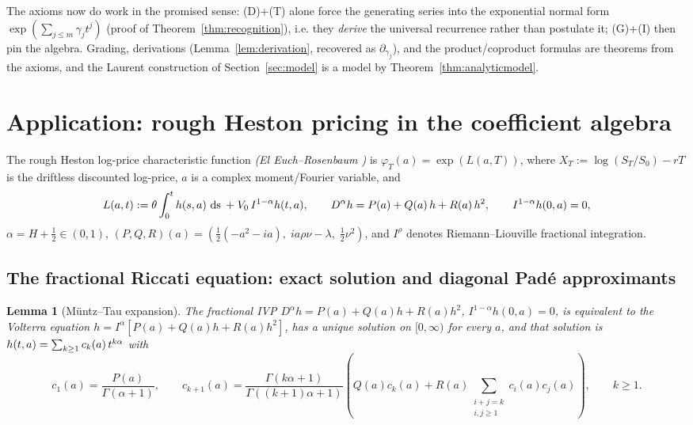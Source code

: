 \documentclass{article}
\newcommand{\assign}{:=}
\newcommand{\tmem}[1]{{\em #1\/}}
\newcommand{\tmop}[1]{\ensuremath{\operatorname{#1}}}
\newtheorem{lemma}{Lemma}
{\theorembodyfont{\rmfamily\small}\newtheorem{problem}{Problem}}
\begin{document}
\begin{remark}
  \label{rem:axiomsdowork}The axioms now do work in the promised sense:
  (D)+(T) alone force the generating series into the exponential normal form
  $\exp (\sum_{j \le m} \gamma_j t^j)$ (proof of
  Theorem~\ref{thm:recognition}), i.e. they {\tmem{derive}} the universal
  recurrence rather than postulate it; (G)+(I) then pin the algebra. Grading,
  derivations (Lemma~\ref{lem:derivation}, recovered as
  $\partial_{\gamma_j}$), and the product/coproduct formulas are theorems from
  the axioms, and the Laurent construction of Section~\ref{sec:model} is a
  model by Theorem~\ref{thm:analyticmodel}.
\end{remark}

\section{Application: rough Heston pricing in the coefficient
algebra}\label{sec:pricing}

The rough Heston log-price characteristic function {\tmem{(El
Euch--Rosenbaum {\cite{ElEuchRosenbaum}})}} is $\varphi_T (a) = \exp (L (a,
T))$, where $X_T \assign \log (S_T / S_0) - rT$ is the driftless discounted
log-price, $a$ is a complex moment/Fourier variable, and
\[ L (a, t) \assign \theta \int_0^t h (s, a)  \hspace{0.17em} \tmop{ds} \;
   + \; V_0  \hspace{0.17em} I^{1 - \alpha} h (t, a), \qquad D^{\alpha} h =
   P (a) + Q (a)  \hspace{0.17em} h + R (a)  \hspace{0.17em} h^2, \qquad I^{1
   - \alpha} h (0, a) = 0, \]
$\alpha = H + \tfrac{1}{2} \in (0, 1)$, $(P, Q, R) (a) = \left( \tfrac{1}{2}
(- a^2 - ia), \; ia \rho \nu - \lambda, \; \tfrac{1}{2} \nu^2 \right)$, and
$I^{\rho}$ denotes Riemann--Liouville fractional integration.

\subsection{The fractional Riccati equation: exact solution and diagonal
Pad{\'e} approximants}\label{subsec:riccati}

\begin{lemma}
  [M{\"u}ntz--Tau expansion]\label{lem:muntz} The fractional IVP $D^{\alpha} h
  = P (a) + Q (a) h + R (a) h^2$, $I^{1 - \alpha} h (0, a) = 0$, is equivalent
  to the Volterra equation $h = I^{\alpha} [P (a) + Q (a) h + R (a) h^2]$, has
  a unique solution on $[0, \infty)$ for every $a$, and that solution is $h
  (t, a) = \sum_{k \ge 1} c_k (a)  \hspace{0.17em} t^{k \alpha}$ with
  \[ c_1 (a) = \frac{P (a)}{\Gamma (\alpha + 1)}, \qquad c_{k + 1} (a) =
     \frac{\Gamma (k \alpha + 1)}{\Gamma ((k + 1) \alpha + 1)} \left( Q (a)
     c_k (a) + R (a) \sum_{\substack{i + j = k \\ i, j \ge 1}} c_i (a) c_j (a)
     \right), \qquad k \ge 1. \]
\end{lemma}
\end{document}
